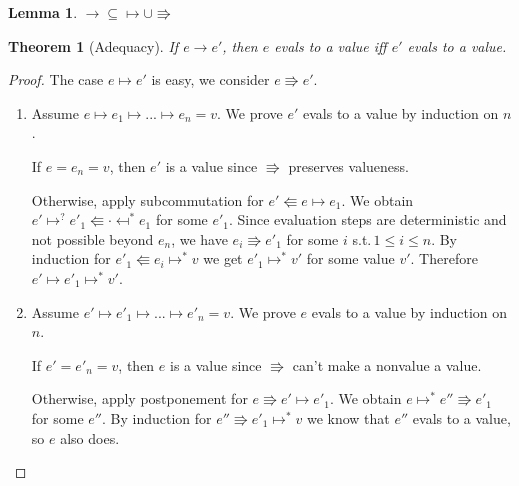 \documentclass[a4paper, 11pt,titlepage, openright, twoside]{report}
\newcommand{\+}{\enspace}
\newtheorem{corollary}{Corollary}
\newtheorem{lemma}{Lemma}
\newtheorem{theorem}{Theorem}
\begin{document}
\begin{lemma}
	${→} ⊆ {↦ ∪ \Rrightarrow}$
\end{lemma}

\begin{theorem}[Adequacy]
	If $e → e'$, then $e$ evals to a value iff $e'$ evals to a value.
\end{theorem}
\begin{proof}

%
	The case $e ↦ e'$ is easy, we consider $e \Rrightarrow e'$.

	\begin{enumerate}
		\item
			Assume $e ↦ e_1 ↦ ... ↦ e_n = v$.
			We prove $e'$ evals to a value by induction on $n$.

			If $e=e_n=v$, then $e'$ is a value since $\Rrightarrow$ preserves valueness.

			Otherwise, apply subcommutation for $e' \Lleftarrow e ↦ e_1$.
			We obtain $e' ↦^? e'_1 \Lleftarrow · \mapsfrom^* e_1$ for some $e'_1$.
			Since evaluation steps are deterministic and not possible beyond $e_n$,
			we have $e_i \Rrightarrow e'_1$ for some $i$ s.t.\,$1 ≤ i ≤ n$.
			By induction for $e'_1 \Lleftarrow e_i ↦^* v$ we get $e'_1 ↦^* v'$ for some value $v'$.
			Therefore $e' ↦ e'_1 ↦^* v'$.

		\item
			Assume $e' ↦ e'_1 ↦ ... ↦ e'_n = v$.
			We prove $e$ evals to a value by induction on $n$.

			If $e'=e'_n=v$, then $e$ is a value since $\Rrightarrow$ can't make a nonvalue a value.

			Otherwise, apply postponement for $e \Rrightarrow e' ↦ e'_1$.
			We obtain $e ↦^* e'' \Rrightarrow e'_1$ for some $e''$.
			By induction for $e'' \Rrightarrow e'_1 ↦^* v$ we know that $e''$ evals to a value,
			so $e$ also does.

	\end{enumerate}
\end{proof}
\end{document}
